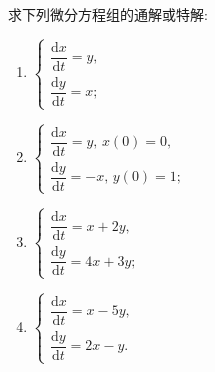 \documentclass[lang=cn,11pt]{elegantbook}
\begin{document}
\begin{exercise}[解微分方程组综合]
求下列微分方程组的通解或特解:
\begin{enumerate}
    \item[(1)] $\begin{cases}\dfrac{\mathrm{d}x}{\mathrm{d}t} = y, \\ \dfrac{\mathrm{d}y}{\mathrm{d}t} = x; \end{cases}$
    \item[(2)] $\begin{cases}\dfrac{\mathrm{d}x}{\mathrm{d}t} = y,\, x(0)=0, \\\dfrac{\mathrm{d}y}{\mathrm{d}t} = -x,\, y(0)=1;\end{cases}$
    \item[(3)] $\begin{cases} \dfrac{\mathrm{d}x}{\mathrm{d}t} = x+2y, \\ \dfrac{\mathrm{d}y}{\mathrm{d}t} = 4x+3y; \end{cases}$
    \item[(4)] $\begin{cases} \dfrac{\mathrm{d}x}{\mathrm{d}t} = x-5y, \\ \dfrac{\mathrm{d}y}{\mathrm{d}t} = 2x-y. \end{cases}$
\end{enumerate}
\end{exercise}
\end{document}
